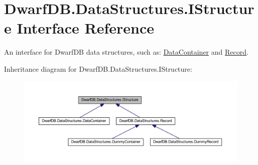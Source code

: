 \hypertarget{interface_dwarf_d_b_1_1_data_structures_1_1_i_structure}{
\section{DwarfDB.DataStructures.IStructure Interface Reference}
\label{interface_dwarf_d_b_1_1_data_structures_1_1_i_structure}
}


An interface for DwarfDB data structures, such as: \hyperlink{class_dwarf_d_b_1_1_data_structures_1_1_data_container}{DataContainer} and \hyperlink{class_dwarf_d_b_1_1_data_structures_1_1_record}{Record}.  




Inheritance diagram for DwarfDB.DataStructures.IStructure:
\nopagebreak
\begin{figure}[H]
\begin{center}
\leavevmode
\includegraphics[width=400pt]{interface_dwarf_d_b_1_1_data_structures_1_1_i_structure__inherit__graph}
\end{center}
\end{figure}
